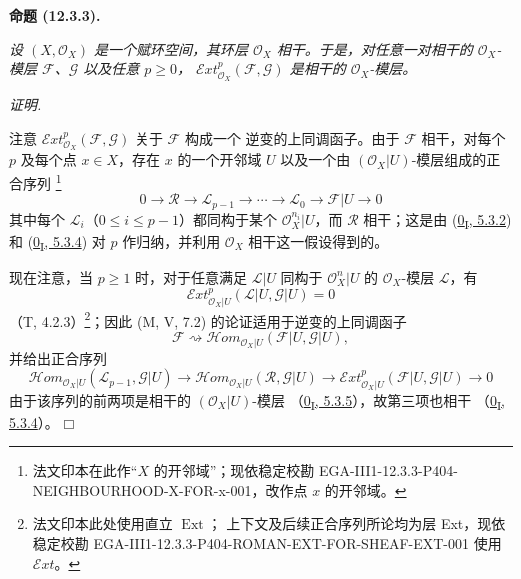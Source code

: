 \documentclass[UTF8,fontset=none,11pt,oneside,openany]{ctexbook}
\providecommand{\square}{\mdlgwhtsquare}
\renewcommand{\leadsto}{\mathrel{\rightsquigarrow}}
\newcommand{\SourceCorrectionNote}[1]{\footnote{#1}}
\newenvironment{proposition}[1][]{%
  \par\medskip\noindent\textbf{命题 (#1).}\ %
}{\par}
\newenvironment{proof}{%
  \par\smallskip\noindent\textit{证明.}\ %
}{\hfill$\square$\par}
\let\EGAOriginalLabel\label
\renewcommand{\label}[1]{\phantomsection\EGAOriginalLabel{#1}}
\begin{document}
\begin{proposition}[12.3.3]
\label{0.12.3.3-fr}
\emph{设 $(X,\mathcal O_X)$ 是一个赋环空间，其环层
$\mathcal O_X$ 相干。于是，对任意一对相干的
$\mathcal O_X$-模层 $\mathcal F$、$\mathcal G$ 以及任意 $p\geq0$，
$\mathcal{E}xt_{\mathcal O_X}^p(\mathcal F,\mathcal G)$ 是相干的
$\mathcal O_X$-模层。}
\end{proposition}

\begin{proof}
注意 $\mathcal{E}xt_{\mathcal O_X}^p(\mathcal F,\mathcal G)$ 关于 $\mathcal F$ 构成一个
逆变的上同调函子。由于 $\mathcal F$ 相干，对每个 $p$ 及每个点 $x\in X$，存在
$x$ 的一个开邻域 $U$ 以及一个由 $(\mathcal O_X|U)$-模层组成的正合序列
\SourceCorrectionNote{法文印本在此作“$X$ 的开邻域”；现依稳定校勘
EGA-III1-12.3.3-P404-NEIGHBOURHOOD-X-FOR-x-001，改作点 $x$ 的开邻域。}
\[
0\longrightarrow\mathcal R\longrightarrow\mathcal L_{p-1}
\longrightarrow\cdots\longrightarrow\mathcal L_0
\longrightarrow\mathcal F|U\longrightarrow0
\]
其中每个 $\mathcal L_i$（$0\leq i\leq p-1$）都同构于某个
$\mathcal O_X^{n_i}|U$，而 $\mathcal R$ 相干；这是由
(\hyperref[0.5.3.2-fr]{0\textsubscript{I}, 5.3.2}) 和
(\hyperref[0.5.3.4-fr]{0\textsubscript{I}, 5.3.4}) 对 $p$ 作归纳，并利用
$\mathcal O_X$ 相干这一假设得到的。

现在注意，当 $p\geq1$ 时，对于任意满足 $\mathcal L|U$ 同构于
$\mathcal O_X^n|U$ 的 $\mathcal O_X$-模层 $\mathcal L$，有
\[
\mathcal{E}xt_{\mathcal O_X|U}^p(\mathcal L|U,\mathcal G|U)=0
\]
（T, 4.2.3）\SourceCorrectionNote{法文印本此处使用直立 $\operatorname{Ext}$；
上下文及后续正合序列所论均为层 Ext，现依稳定校勘
EGA-III1-12.3.3-P404-ROMAN-EXT-FOR-SHEAF-EXT-001 使用
$\mathcal{E}xt$。}；因此 (M, V, 7.2) 的论证适用于逆变的上同调函子
\[
\mathcal F\leadsto
\mathcal{H}om_{\mathcal O_X|U}(\mathcal F|U,\mathcal G|U),
\]
并给出正合序列
\[
\mathcal{H}om_{\mathcal O_X|U}(\mathcal L_{p-1},\mathcal G|U)
\longrightarrow
\mathcal{H}om_{\mathcal O_X|U}(\mathcal R,\mathcal G|U)
\longrightarrow
\mathcal{E}xt_{\mathcal O_X|U}^p(\mathcal F|U,\mathcal G|U)
\longrightarrow0
\]
由于该序列的前两项是相干的 $(\mathcal O_X|U)$-模层
（\hyperref[0.5.3.5-fr]{0\textsubscript{I}, 5.3.5}），故第三项也相干
（\hyperref[0.5.3.4-fr]{0\textsubscript{I}, 5.3.4}）。
\end{proof}
\end{document}

